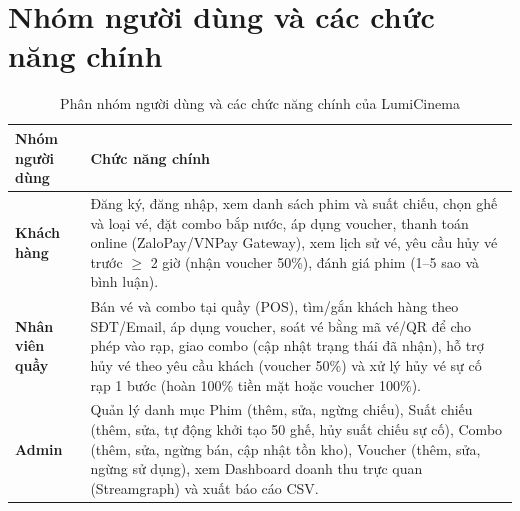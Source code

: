 \section{Nhóm người dùng và các chức năng chính}
\begin{table}[H]
\centering
\caption{Phân nhóm người dùng và các chức năng chính của LumiCinema}
\label{tab:actors_functions}
\renewcommand{\arraystretch}{1.3}
\begin{tabular}{|p{3.0cm}|p{12.2cm}|}
\hline
\rowcolor{headerblue} \textbf{Nhóm người dùng} & \textbf{Chức năng chính} \\ \hline
\textbf{Khách hàng} & Đăng ký, đăng nhập, xem danh sách phim và suất chiếu, chọn ghế và loại vé, đặt combo bắp nước, áp dụng voucher, thanh toán online (ZaloPay/VNPay Gateway), xem lịch sử vé, yêu cầu hủy vé trước $\ge$ 2 giờ (nhận voucher 50\%), đánh giá phim (1--5 sao và bình luận). \\ \hline
\textbf{Nhân viên quầy} & Bán vé và combo tại quầy (POS), tìm/gắn khách hàng theo SĐT/Email, áp dụng voucher, soát vé bằng mã vé/QR để cho phép vào rạp, giao combo (cập nhật trạng thái đã nhận), hỗ trợ hủy vé theo yêu cầu khách (voucher 50\%) và xử lý hủy vé sự cố rạp 1 bước (hoàn 100\% tiền mặt hoặc voucher 100\%). \\ \hline
\textbf{Admin} & Quản lý danh mục Phim (thêm, sửa, ngừng chiếu), Suất chiếu (thêm, sửa, tự động khởi tạo 50 ghế, hủy suất chiếu sự cố), Combo (thêm, sửa, ngừng bán, cập nhật tồn kho), Voucher (thêm, sửa, ngừng sử dụng), xem Dashboard doanh thu trực quan (Streamgraph) và xuất báo cáo CSV. \\ \hline
\end{tabular}
\end{table}
